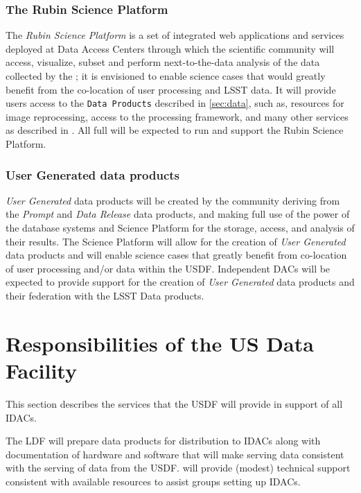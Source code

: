 \subsubsection{The Rubin \gls{Science Platform}}

The {\it Rubin \gls{Science Platform}}   is a set of integrated web applications and services deployed at  \RO Data Access Centers through which the scientific community will access, visualize, subset and perform next-to-the-data analysis of the data collected by the \RO; it is envisioned to enable science cases that would greatly benefit from the co-location of user processing and \gls{LSST} data. It will provide users access to the {\tt Data Products} described in \ref{sec:data}, such as, resources for image reprocessing, access to the \RO processing framework, and many other services as described in .  All full  will be expected to run and support the Rubin \gls{Science Platform}.

\subsubsection{User Generated data products }

{\it User Generated} data products will be created by the community deriving from the {\it Prompt} and {\it \gls{Data Release}} data products, and making  full use of the power of the \RO database systems and
Science Platform for the storage, access, and analysis of their results.
The \gls{Science Platform} will allow for the creation of {\it User Generated} data products and will enable science cases that greatly benefit from co-location of user processing and/or data within the USDF.  Independent DACs will be expected to provide support for the creation of {\it User Generated} data products and their federation with the \gls{LSST} Data products.

\section{Responsibilities of the \gls{US} Data Facility}

This section describes the services that the USDF will provide in support of all  IDACs.

The \gls{LDF} will prepare data products for distribution to IDACs along with documentation of hardware and software that will make serving \RO data consistent with the serving of data from the USDF. \RO will provide (modest) technical support consistent with available resources to assist groups setting up IDACs.

